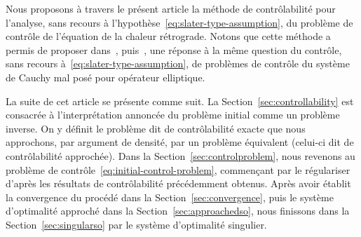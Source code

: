 Nous proposons à travers le présent article la méthode de contrôlabilité
pour l'analyse, sans recours à
l'hypothèse~\eqref{eq:slater-type-assumption}, du problème de contrôle de
l'équation de la chaleur rétrograde. Notons que cette méthode a permis de
proposer dans~\cite{ownElliptic}, puis~\cite{ownAAA}, une réponse à la même
question du contrôle, sans recours à~\eqref{eq:slater-type-assumption}, de
problèmes de contrôle du système de Cauchy mal posé pour opérateur
elliptique.

La suite de cet article se présente comme suit. La
Section~\ref{sec:controllability} est consacrée à l'interprétation annoncée
du problème initial comme un problème inverse. On y définit le problème dit
de contrôlabilité exacte que nous approchons, par argument de densité, par
un problème équivalent (celui-ci dit de contrôlabilité approchée). Dans la
Section~\ref{sec:controlproblem}, nous revenons au problème de
contrôle~\eqref{eq:initial-control-problem}, commençant par le régulariser
d'après les résultats de contrôlabilité précédemment obtenus. Après avoir
établit la convergence du procédé dans la Section~\ref{sec:convergence},
puis le système d'optimalité approché dans la
Section~\ref{sec:approachedso}, nous finissons dans la
Section~\ref{sec:singularso} par le système d'optimalité singulier.
